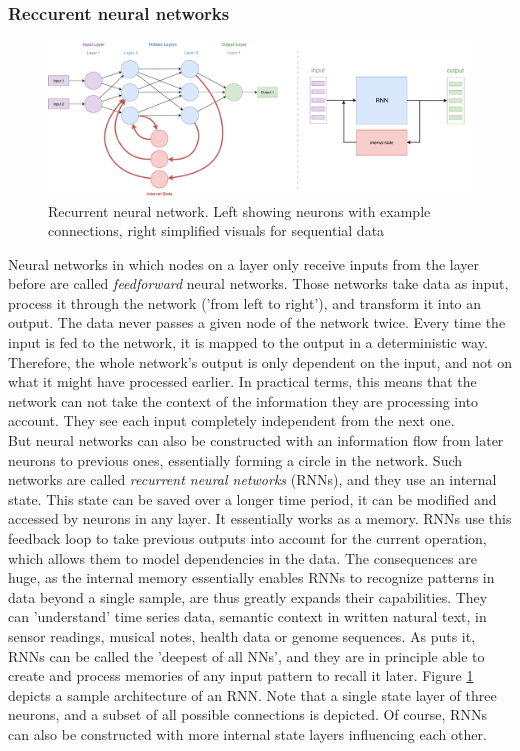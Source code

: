 \documentclass[
	a4paper,
	pagesize,
	pdftex,
	12pt,
	twoside, %
	BCOR=5mm, %
	ngerman,
	fleqn,
	final,
	]{scrartcl}
\begin{document}
\subsubsection{Reccurent neural networks}\label{RNN}
\begin{figure}[ht]
	\centering
	\includegraphics[width=\linewidth]{img/RecurrentNeuralNetwork}
	\caption{Recurrent neural network. Left showing neurons with example connections, right simplified visuals for sequential data}
	\label{fig:rnn}
\end{figure}
Neural networks in which nodes on a layer only receive inputs from the layer before are called \textit{feedforward} neural networks. Those networks take data as input, process it through the network ('from left to right'), and transform it into an output. The data never passes a given node of the network twice. Every time the input is fed to the network, it is mapped to the output in a deterministic way. Therefore, the whole network's output is only dependent on the input, and not on what it might have processed earlier. In practical terms, this means that the network can not take the context of the information they are processing into account. They see each input completely independent from the next one.\\
But neural networks can also be constructed with an information flow from later neurons to previous ones, essentially forming a circle in the network. Such networks are called \textit{recurrent neural networks} (RNNs), and they use an internal state. This state can be saved over a longer time period, it can be modified and accessed by neurons in any layer. It essentially works as a memory. RNNs use this feedback loop to take previous outputs into account for the current operation, which allows them to model dependencies in the data. The consequences are huge, as the internal memory essentially enables RNNs to recognize patterns in data beyond a single sample, are thus greatly expands their capabilities. They can 'understand' time series data, semantic context in written natural text, in sensor readings, musical notes, health data or genome sequences. As \cite{Schmidhuber.2015} puts it, RNNs can be called the 'deepest of all NNs', and they are in principle able to create and process memories of any input pattern to recall it later. Figure \ref{fig:rnn} depicts a sample architecture of an RNN. Note that a single state layer of three neurons, and a subset of all possible connections is depicted. Of course, RNNs can also be constructed with more internal state layers influencing each other.\\
\end{document}
